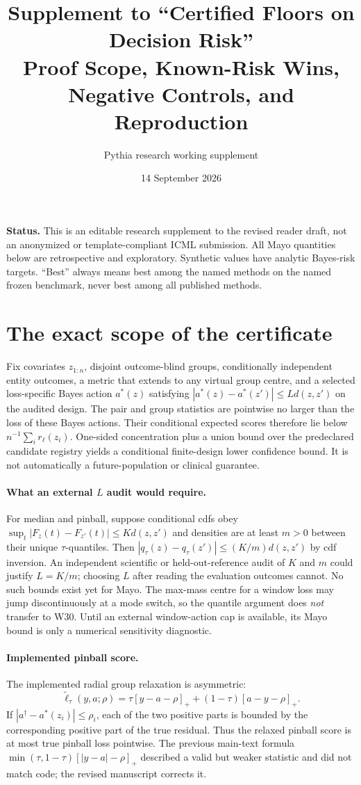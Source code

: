 \documentclass[10pt]{article}
\title{Supplement to ``Certified Floors on Decision Risk''\\
\large Proof Scope, Known-Risk Wins, Negative Controls, and Reproduction}
\author{Pythia research working supplement}
\date{14 September 2026}
\begin{document}
\maketitle

\noindent\textbf{Status.} This is an editable research supplement to the revised reader draft, not an anonymized or template-compliant ICML submission. All Mayo quantities below are retrospective and exploratory. Synthetic values have analytic Bayes-risk targets. ``Best'' always means best among the named methods on the named frozen benchmark, never best among all published methods.

\section{The exact scope of the certificate}
Fix covariates $z_{1:n}$, disjoint outcome-blind groups, conditionally independent entity outcomes, a metric that extends to any virtual group centre, and a selected loss-specific Bayes action $a^*(z)$ satisfying $|a^*(z)-a^*(z')|\le Ld(z,z')$ on the audited design. The pair and group statistics are pointwise no larger than the loss of these Bayes actions. Their conditional expected scores therefore lie below $n^{-1}\sum_i r_\ell(z_i)$. One-sided concentration plus a union bound over the predeclared candidate registry yields a conditional finite-design lower confidence bound. It is not automatically a future-population or clinical guarantee.

\paragraph{What an external $L$ audit would require.} For median and pinball, suppose conditional cdfs obey $\sup_t|F_z(t)-F_{z'}(t)|\le Kd(z,z')$ and densities are at least $m>0$ between their unique $\tau$-quantiles. Then $|q_\tau(z)-q_\tau(z')|\le (K/m)d(z,z')$ by cdf inversion. An independent scientific or held-out-reference audit of $K$ and $m$ could justify $L=K/m$; choosing $L$ after reading the evaluation outcomes cannot. No such bounds exist yet for Mayo. The max-mass centre for a window loss may jump discontinuously at a mode switch, so the quantile argument does \emph{not} transfer to W30. Until an external window-action cap is available, its Mayo bound is only a numerical sensitivity diagnostic.

\paragraph{Implemented pinball score.} The implemented radial group relaxation is asymmetric:
\[
\tilde\ell_\tau(y,a;\rho)=\tau[y-a-\rho]_+ +(1-\tau)[a-y-\rho]_+.
\]
If $|a^\dagger-a^*(z_i)|\le\rho_i$, each of the two positive parts is bounded by the corresponding positive part of the true residual. Thus the relaxed pinball score is at most true pinball loss pointwise. The previous main-text formula $\min(\tau,1-\tau)[|y-a|-\rho]_+$ described a valid but weaker statistic and did not match code; the revised manuscript corrects it.
\end{document}
